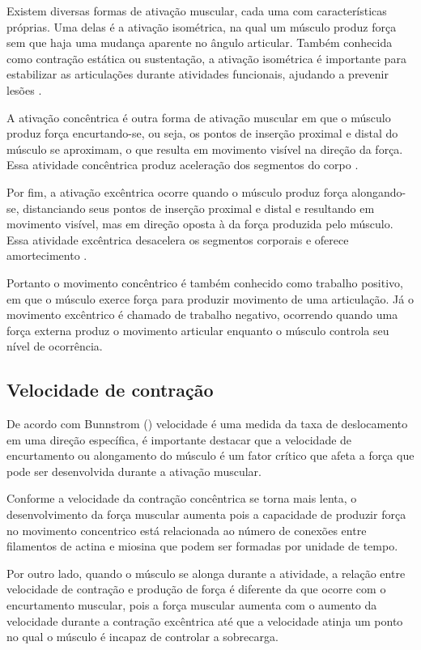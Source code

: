 Existem diversas formas de ativação muscular, cada uma com características próprias. Uma delas é a ativação isométrica, na qual um músculo produz força sem que haja uma mudança aparente no ângulo articular. Também conhecida como contração estática ou sustentação, a ativação isométrica é importante para estabilizar as articulações durante atividades funcionais, ajudando a prevenir lesões \cite{cinesiologia}.

A ativação concêntrica é outra forma de ativação muscular em que o músculo produz força encurtando-se, ou seja, os pontos de inserção proximal e distal do músculo se aproximam, o que resulta em movimento visível na direção da força. Essa atividade concêntrica produz aceleração dos segmentos do corpo \cite{cinesiologia}.

Por fim, a ativação excêntrica ocorre quando o músculo produz força alongando-se, distanciando seus pontos de inserção proximal e distal e resultando em movimento visível, mas em direção oposta à da força produzida pelo músculo. Essa atividade excêntrica desacelera os segmentos corporais e oferece amortecimento \cite{cinesiologia}.

Portanto o movimento concêntrico é também conhecido como trabalho positivo, em que o músculo exerce força para produzir movimento de uma articulação. Já o movimento excêntrico é chamado de trabalho negativo, ocorrendo quando uma força externa produz o movimento articular enquanto o músculo controla seu nível de ocorrência.



\subsection[Velocidade de Contração]{Velocidade de contração}
De acordo com Bunnstrom (\citeyear{cinesiologia}) velocidade é uma medida da taxa de deslocamento em uma direção específica, é importante destacar que a velocidade de encurtamento ou alongamento do músculo é um fator crítico que afeta a força que pode ser desenvolvida durante a ativação muscular.

Conforme a velocidade da contração concêntrica se torna mais lenta, o desenvolvimento da força muscular aumenta pois a capacidade de produzir força no movimento concentrico está relacionada ao número de conexões entre filamentos de actina e miosina que podem ser formadas por unidade de tempo.

Por outro lado, quando o músculo se alonga durante a atividade, a relação entre velocidade de contração e produção de força é diferente da que ocorre com o encurtamento muscular, pois a força muscular aumenta com o aumento da velocidade durante a contração excêntrica até que a velocidade atinja um ponto no qual o músculo é incapaz de controlar a sobrecarga.






